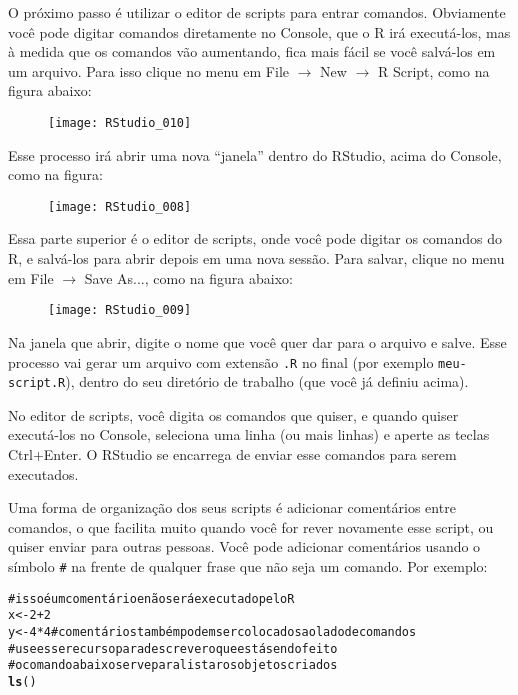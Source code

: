 \documentclass[a4paper,12pt]{article}\usepackage{graphicx, color}
\makeatletter
\newcommand{\hlfunctioncall}[1]{\textcolor[rgb]{0,0,0.545098039215686}{\textbf{#1}}}%
\newcommand{\hlcomment}[1]{\textcolor[rgb]{0.2,0.2,0.2}{#1}}%
\newenvironment{kframe}{%
 \def\at@end@of@kframe{}%
 \ifinner\ifhmode%
  \def\at@end@of@kframe{\end{minipage}}%
  \begin{minipage}{\columnwidth}%
 \fi\fi%
 \def\FrameCommand##1{\hskip\@totalleftmargin \hskip-\fboxsep
 \colorbox{shadecolor}{##1}\hskip-\fboxsep
     \hskip-\linewidth \hskip-\@totalleftmargin \hskip\columnwidth}%
 \MakeFramed {\advance\hsize-\width
   \@totalleftmargin\z@ \linewidth\hsize
   \@setminipage}}%
 {\par\unskip\endMakeFramed%
 \at@end@of@kframe}
\newenvironment{knitrout}{}{} %
\providecommand{\R}{\textsf{R}\xspace}
\providecommand{\RStudio}{\textsf{RStudio}\xspace}
\makeatother
\begin{document}
O próximo passo é utilizar o editor de scripts para entrar
comandos. Obviamente você pode digitar comandos diretamente no
\textsf{Console}, que o \R irá executá-los, mas à medida que os comandos
vão aumentando, fica mais fácil se você salvá-los em um arquivo. Para
isso clique no menu em \textsf{File $\rightarrow$ New $\rightarrow$ R
  Script}, como na figura abaixo:

\begin{figure}[H]
  \centering
  \texttt{[image: RStudio\_010]}
\end{figure}

Esse processo irá abrir uma nova ``janela'' dentro do \RStudio, acima do
\textsf{Console}, como na figura:

\begin{figure}[H]
  \centering
  \texttt{[image: RStudio\_008]}
\end{figure}

Essa parte superior é o editor de scripts, onde você pode digitar os
comandos do \R, e salvá-los para abrir depois em uma nova sessão. Para
salvar, clique no menu em \textsf{File $\rightarrow$ Save As...}, como
na figura abaixo:

\begin{figure}[H]
  \centering
  \texttt{[image: RStudio\_009]}
\end{figure}

Na janela que abrir, digite o nome que você quer dar para o arquivo e
salve. Esse processo vai gerar um arquivo com extensão \texttt{.R} no
final (por exemplo \texttt{meu-script.R}), dentro do seu diretório de
trabalho (que você já definiu acima).

No editor de scripts, você digita os comandos que quiser, e quando
quiser executá-los no \textsf{Console}, seleciona uma linha (ou mais
linhas) e aperte as teclas \textsf{Ctrl+Enter}. O \RStudio se encarrega
de enviar esse comandos para serem executados.

Uma forma de organização dos seus scripts é adicionar comentários entre
comandos, o que facilita muito quando você for rever novamente esse
script, ou quiser enviar para outras pessoas. Você pode adicionar
comentários usando o símbolo \texttt{\#} na frente de qualquer frase que
não seja um comando. Por exemplo:

\begin{knitrout}\small
{}\color{fgcolor}\begin{kframe}
\begin{alltt}
 \hlcomment{# isso é um comentário e não será executado pelo R}
 x <- 2 + 2
 y <- 4 * 4 \hlcomment{# comentários também podem ser colocados ao lado de comandos}
 \hlcomment{# use esse recurso para descrever o que está sendo feito}
 \hlcomment{# o comando abaixo serve para listar os objetos criados}
 \hlfunctioncall{ls}()
\end{alltt}
\end{kframe}
\end{knitrout}
\end{document}
